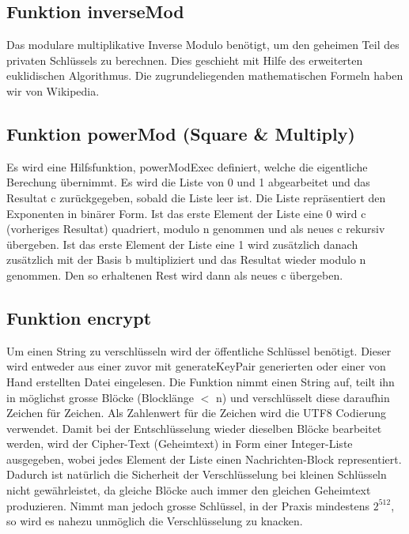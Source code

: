 \documentclass[a4paper, 11pt]{article} %
\begin{document}
\subsection{Funktion inverseMod}
Das modulare multiplikative Inverse Modulo benötigt, um den geheimen Teil des privaten Schlüssels zu berechnen. Dies geschieht mit Hilfe des erweiterten euklidischen Algorithmus. Die zugrundeliegenden mathematischen Formeln haben wir von Wikipedia.


\subsection{Funktion powerMod (Square \& Multiply)}
Es wird eine Hilfsfunktion, powerModExec definiert, welche die eigentliche Berechung übernimmt. Es wird die Liste von 0 und 1 abgearbeitet und das Resultat c zurückgegeben, sobald die Liste leer ist. Die Liste repräsentiert den Exponenten in binärer Form. Ist das erste Element der Liste eine 0 wird c (vorheriges Resultat) quadriert, modulo n genommen und als neues c rekursiv übergeben. Ist das erste Element der Liste eine 1 wird zusätzlich danach zusätzlich mit der Basis b multipliziert und das Resultat wieder modulo n genommen. Den so erhaltenen Rest wird dann als neues c übergeben.



\subsection{Funktion encrypt}
Um einen String zu verschlüsseln wird der öffentliche Schlüssel benötigt. Dieser wird entweder aus einer zuvor mit generateKeyPair generierten oder einer von Hand erstellten Datei eingelesen.
Die Funktion nimmt einen String auf, teilt ihn in möglichst grosse Blöcke (Blocklänge $<$ n) und verschlüsselt diese daraufhin Zeichen für Zeichen. Als Zahlenwert für die Zeichen wird die UTF8 Codierung verwendet.
Damit bei der Entschlüsselung wieder dieselben Blöcke bearbeitet werden, wird der Cipher-Text (Geheimtext) in Form einer Integer-Liste ausgegeben, wobei jedes Element der Liste einen Nachrichten-Block representiert.
Dadurch ist natürlich die Sicherheit der Verschlüsselung bei kleinen Schlüsseln nicht gewährleistet, da gleiche Blöcke auch immer den gleichen Geheimtext produzieren. Nimmt man jedoch grosse Schlüssel, in der Praxis mindestens $2^{512}$, so wird es nahezu unmöglich die Verschlüsselung zu knacken.
\end{document}
